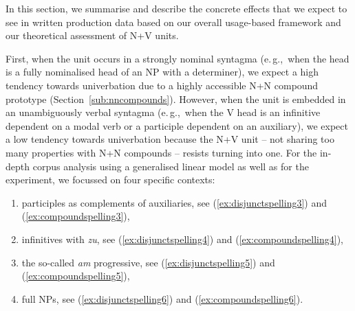 \documentclass[biblatex, charis, linguex]{glossa}\usepackage{knitr}
\newcommand{\egg}{e.\,g.,\ }
\begin{document}
In this section, we summarise and describe the concrete effects that we expect to see in written production data based on our overall usage-based framework and our theoretical assessment of N+V units.

First, when the unit occurs in a strongly nominal syntagma (\egg when the head is a fully nominalised head of an NP with a determiner), we expect a high tendency towards univerbation due to a highly accessible N+N compound prototype (Section~\ref{sub:nncompounds}).
However, when the unit is embedded in an unambiguously verbal syntagma (\egg when the V head is an infinitive dependent on a modal verb or a participle dependent on an auxiliary), we expect a low tendency towards univerbation because the N+V unit -- not sharing too many properties with N+N compounds -- resists turning into one.
For the in-depth corpus analysis using a generalised linear model as well as for the experiment, we focussed on four specific contexts:

\vspace{\baselineskip}

\renewcommand{\theenumi}{\roman{enumi}}
\begin{enumerate}
  \item{\label{contpart} participles as complements of auxiliaries, see (\ref{ex:disjunctspelling3}) and (\ref{ex:compoundspelling3}),}
  \item{\label{continf}  infinitives with \textit{zu}, see (\ref{ex:disjunctspelling4}) and (\ref{ex:compoundspelling4}),}
  \item{\label{contprog} the so-called \textit{am} progressive, see (\ref{ex:disjunctspelling5}) and (\ref{ex:compoundspelling5}),}
  \item{\label{contnp}   full NPs, see (\ref{ex:disjunctspelling6}) and (\ref{ex:compoundspelling6}).}
\end{enumerate}

\vspace{\baselineskip}
\end{document}
